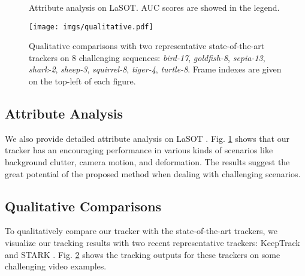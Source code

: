 \begin{figure}[t]
\centering
{}
\enspace
{}
\enspace
{}
\enspace
{}
\enspace
{}
\enspace
{}
\enspace
{}
\enspace
{}
\enspace
{}
\enspace
{}
\enspace
{}
\enspace
{}
\enspace
{}
\enspace
{}
\caption{Attribute analysis on LaSOT. AUC scores are showed in the legend.}
\label{figure-analysis}
\end{figure}

\begin{figure}[t]
\centering
\texttt{[image: imgs/qualitative.pdf]}
\caption{Qualitative comparisons with two representative state-of-the-art trackers on 8 challenging sequences: \textit{bird-17}, \textit{goldfish-8}, \textit{sepia-13}, \textit{shark-2}, \textit{sheep-3}, \textit{squirrel-8}, \textit{tiger-4}, \textit{turtle-8}. Frame indexes are given on the top-left of each figure.}
\label{figure-qualitative}
\end{figure}

\subsection{Attribute Analysis}
We also provide detailed attribute analysis on LaSOT \cite{fan2019lasot}. Fig. \ref{figure-analysis} shows that our tracker has an encouraging performance in various kinds of scenarios like background clutter, camera motion, and deformation. The results suggest the great potential of the proposed method when dealing with challenging scenarios.

\subsection{Qualitative Comparisons}
To qualitatively compare our tracker with the state-of-the-art trackers, we visualize our tracking results with two recent representative trackers: KeepTrack \cite{mayer2021learning} and STARK \cite{yan2021learning}. Fig. \ref{figure-qualitative} shows the tracking outputs for these trackers on some challenging video examples.

